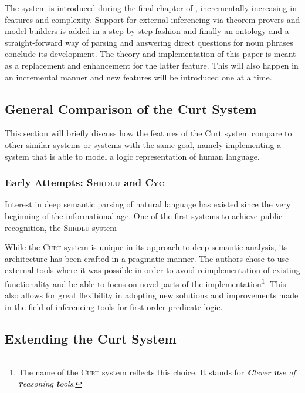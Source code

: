 \documentclass[a4paper]{article}
\newcommand{\pn}{\textsc} %
\begin{document}
The system is introduced during the final chapter of \cite{blackburnbos:cl1},
incrementally increasing in features and complexity. Support for external
inferencing via theorem provers and model builders is added in a step-by-step
fashion and finally an ontology and a straight-forward way of parsing and
answering direct questions for noun phrases conclude its development. The theory
and implementation of this paper is meant as a replacement and enhancement for
the latter feature. This will also happen in an incremental manner and new
features will be introduced one at a time.

\subsection{General Comparison of the Curt System}\label{sec:comparision}

This section will briefly discuss how the features of the Curt system compare to
other similar systems or systems with the same goal, namely implementing a
system that is able to model a logic representation of human language.

\subsubsection{Early Attempts: \pn{Shrdlu} and \pn{Cyc}}

Interest in deep semantic parsing of natural language has existed since the very
beginning of the informational age. One of the first systems to achieve public
recognition, the \pn{Shrdlu} system 

While the \pn{Curt} system is unique in its approach to deep semantic analysis, its
architecture has been crafted in a pragmatic manner. The authors chose to use
external tools where it was possible in order to avoid reimplementation of
existing functionality and be able to focus on novel parts of the
implementation\footnote{The name of the \pn{Curt} system reflects this choice.
It stands for \emph{\textbf{C}lever \textbf{u}se of \textbf{r}easoning
\textbf{t}ools}.}. This also allows for great flexibility in adopting new
solutions and improvements made in the field of inferencing tools for first
order predicate logic.

\subsection{Extending the Curt System}
\end{document}
